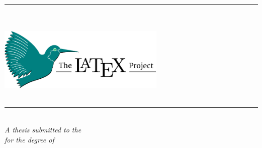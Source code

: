 \begin{titlepage}
    \begin{center}
        \large  
        \hfill
        \vfill
        \begingroup
          {\LARGE \color{title}\textsc{\myTitle}} \\ \smallskip 
	\rule{200pt}{0.5pt} \\  
	 {\large \textit{\color{MidnightBlue}\mySubtitle}} \\ \vspace{1.5cm}
        \endgroup
        \vspace{1.5cm}
        		\includegraphics[width=8cm]{gfx/title/logo} \\ \smallskip
		\vfill
	       	 {\Large \textsc{\myName}} \\
		 \rule{200pt}{0.5pt} \\
  		 \vspace{0.5cm}
    	{\normalsize \textit{A thesis submitted to the \myUni}} \\ \vspace{-0.5cm}
	{\normalsize \textit{for the degree of \myDegree}} \\ 
          {\normalsize \myTime}
        \vfill                      
    \end{center}  
    
\addtocounter{page}{-1}   
\end{titlepage}   